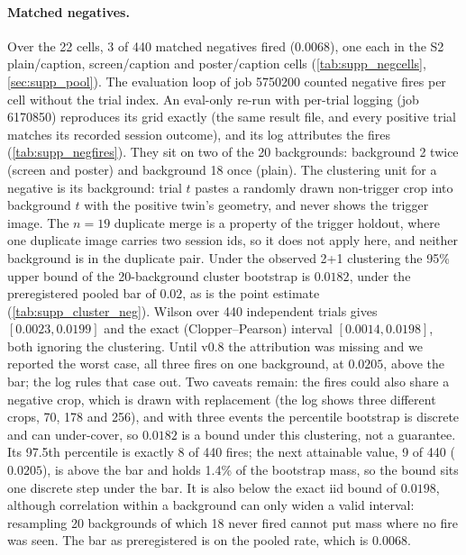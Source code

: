 \paragraph{Matched negatives.}
Over the 22 cells, 3 of 440 matched negatives fired ($0.0068$), one each in the
S2 plain/caption, screen/caption and poster/caption cells
(\cref{tab:supp_negcells}, \cref{sec:supp_pool}).
The evaluation loop of job 5750200 counted negative fires per cell without the
trial index. An eval-only re-run with per-trial logging (job 6170850) reproduces
its grid exactly (the same result file, and every positive trial matches its
recorded session outcome), and its log attributes the fires
(\cref{tab:supp_negfires}). They sit on two of the 20 backgrounds: background 2
twice (screen and poster) and background 18 once (plain).
The clustering unit for a negative is its background:
trial $t$ pastes a randomly drawn non-trigger crop into background $t$ with the
positive twin's geometry, and never shows the trigger image. The $n{=}19$
duplicate merge is a property of the trigger holdout, where one duplicate image
carries two session ids, so it does not apply here, and neither background is
in the duplicate pair. Under the observed 2+1 clustering the 95\% upper bound
of the 20-background cluster bootstrap is $0.0182$, under the preregistered
pooled bar of $0.02$, as is the point estimate (\cref{tab:supp_cluster_neg}).
Wilson over 440 independent trials gives $[0.0023, 0.0199]$ and the exact
(Clopper--Pearson) interval $[0.0014, 0.0198]$, both ignoring the clustering. Until v0.8 the attribution was missing and we reported the worst
case, all three fires on one background, at $0.0205$, above the bar; the log
rules that case out. Two caveats remain: the fires could also share a negative
crop, which is drawn with replacement (the log shows three different crops,
70, 178 and 256), and with three events the percentile bootstrap is discrete and
can under-cover, so $0.0182$ is a bound under this clustering, not a guarantee.
Its 97.5th percentile is exactly 8 of 440 fires; the next attainable value, 9 of 440
($0.0205$), is above the bar and holds 1.4\% of the bootstrap mass, so the bound sits one
discrete step under the bar. It is also below the exact iid bound of $0.0198$, although
correlation within a background can only widen a valid interval: resampling 20 backgrounds of
which 18 never fired cannot put mass where no fire was seen. The bar as preregistered is on
the pooled rate, which is $0.0068$.
